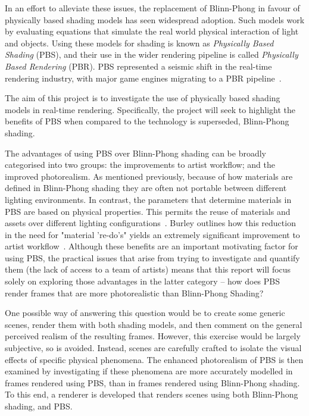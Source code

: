 In an effort to alleviate these issues, the replacement of Blinn-Phong in favour of physically based shading models has seen widespread adoption. Such models work by evaluating equations that simulate the real world physical interaction of light and objects. Using these models for shading is known as \textit{Physically Based Shading} (PBS), and their use in the wider rendering pipeline is called \textit{Physically Based Rendering} (PBR). PBS represented a seismic shift in the real-time rendering industry, with major game engines migrating to a PBR pipeline~\cite{RealShadingInUnreal, MovingFrostbitetoPBR}.

The aim of this project is to investigate the use of physically based shading models in real-time rendering. Specifically, the project will seek to highlight the benefits of PBS when compared to the technology is superseded, Blinn-Phong shading.

The advantages of using PBS over Blinn-Phong shading can be broadly categorised into two groups: the improvements to artist workflow; and the improved photorealism. As mentioned previously, because of how materials are defined in Blinn-Phong shading they are often not portable between different lighting environments. In contrast, the parameters that determine materials in PBS are based on physical properties. This permits the reuse of materials and assets over different lighting configurations~\cite{MovingFrostbitetoPBR, SIGGRAPH2020Course}. Burley outlines how this reduction in the need for "material 're-do's" yields an extremely significant improvement to artist workflow~\cite{Burley2012Physically}. Although these benefits are an important motivating factor for using PBS, the practical issues that arise from trying to investigate and quantify them (the lack of access to a team of artists) means that this report will focus solely on exploring those advantages in the latter category – how does PBS render frames that are more photorealistic than Blinn-Phong Shading?

One possible way of answering this question would be to create some generic scenes, render them with both shading models, and then comment on the general perceived realism of the resulting frames. However, this exercise would be largely subjective, so is avoided. Instead, scenes are carefully crafted to isolate the visual effects of specific physical phenomena. The enhanced photorealism of PBS is then examined by investigating if these phenomena are more accurately modelled in frames rendered using PBS, than in frames rendered using Blinn-Phong shading. To this end, a renderer is developed that renders scenes using both Blinn-Phong shading, and PBS.

